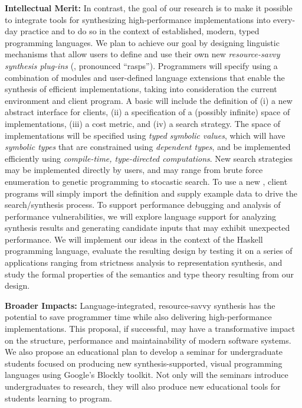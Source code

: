 \documentclass[12pt]{article}
\begin{document}
\noindent
\textbf{Intellectual Merit:}
In contrast, the goal of our research is to make it possible to integrate
tools for synthesizing high-performance implementations into every-day 
practice and to do so in the context of 
established, modern, typed programming languages.  
We plan to achieve our goal
by designing linguistic mechanisms that allow users to define and use 
their own new \emph{resource-savvy synthesis plug-ins} (\rasps,
pronounced ``rasps'').
Programmers will specify \rasps
using a combination of modules and user-defined
language extensions that enable the
synthesis of efficient implementations, taking into consideration the current
environment and client program.  A basic \rasp will include the definition
of (i) a new abstract interface for clients, (ii) a specification of a
(possibly infinite) space of implementations, (iii)
a cost metric, and (iv) a search strategy.  The space of implementations
will be specified using \emph{typed symbolic values}, which will have \emph{symbolic types}
that are constrained using \emph{dependent types}, and be implemented 
efficiently using \emph{compile-time, type-directed computations}.  New 
search strategies may be implemented directly by users, and may range from
brute force enumeration to genetic programming to stocastic search.
To use a new \rasp, client programs will simply import the \rasp definition
and supply example data to drive the search/synthesis process.
To support performance debugging and analysis of performance vulnerabilities,
we will explore language support for analyzing synthesis 
results and generating candidate inputs that may exhibit unexpected 
performance.  We will implement our ideas in the context of the
Haskell programming language, evaluate the resulting design by testing
it on a series of applications ranging from strictness analysis to
representation synthesis, and study the formal properties of the semantics and
type theory resulting from our design.

\noindent
\textbf{Broader Impacts:} 
Language-integrated, resource-savvy synthesis has the potential to
save programmer time while also delivering high-performance implementations.
This proposal, if successful, may have a transformative impact on the
structure, performance and maintainability of modern software systems.
We also propose an educational plan to develop a seminar for 
undergraduate students focused on producing new synthesis-supported,
visual programming languages using Google's Blockly toolkit.  Not only
will the seminars introduce undergraduates to research, they will also
produce new educational tools for students learning to program.
\end{document}
